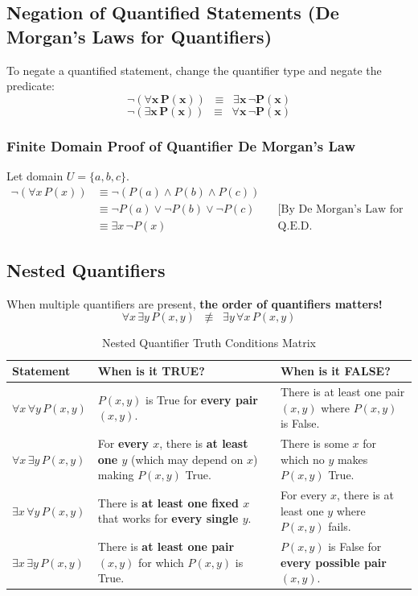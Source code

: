 \documentclass[11pt,a4paper]{article}
\begin{document}
\subsection{Negation of Quantified Statements (De Morgan's Laws for Quantifiers)}

To negate a quantified statement, change the quantifier type and negate the predicate:
$$\mathbf{\neg (\forall x \, P(x)) \;\;\equiv\;\; \exists x \, \neg P(x)}$$
$$\mathbf{\neg (\exists x \, P(x)) \;\;\equiv\;\; \forall x \, \neg P(x)}$$

\subsubsection*{Finite Domain Proof of Quantifier De Morgan's Law}
Let domain $U = \{a, b, c\}$.
\begin{align*}
\neg(\forall x \, P(x)) &\equiv \neg(P(a) \land P(b) \land P(c)) \\
&\equiv \neg P(a) \lor \neg P(b) \lor \neg P(c) && \text{[By De Morgan's Law for Propositional Logic]} \\
&\equiv \exists x \, \neg P(x) && \text{Q.E.D.}
\end{align*}

\subsection{Nested Quantifiers}

When multiple quantifiers are present, \textbf{the order of quantifiers matters!}
$$\forall x \, \exists y \, P(x, y) \;\;\not\equiv\;\; \exists y \, \forall x \, P(x, y)$$

\begin{table}[htbp]
\centering
\small
\begin{tabularx}{\textwidth}{|l|X|X|}
\hline
\rowcolor{secondaryteal} \color{white}\textbf{Statement} & \color{white}\textbf{When is it TRUE?} & \color{white}\textbf{When is it FALSE?} \\ \hline
$\forall x \, \forall y \, P(x, y)$ & $P(x, y)$ is True for \textbf{every pair} $(x, y)$. & There is at least one pair $(x, y)$ where $P(x, y)$ is False. \\ \hline
$\forall x \, \exists y \, P(x, y)$ & For \textbf{every $x$}, there is \textbf{at least one $y$} (which may depend on $x$) making $P(x,y)$ True. & There is some $x$ for which no $y$ makes $P(x,y)$ True. \\ \hline
$\exists x \, \forall y \, P(x, y)$ & There is \textbf{at least one fixed $x$} that works for \textbf{every single $y$}. & For every $x$, there is at least one $y$ where $P(x,y)$ fails. \\ \hline
$\exists x \, \exists y \, P(x, y)$ & There is \textbf{at least one pair} $(x, y)$ for which $P(x, y)$ is True. & $P(x, y)$ is False for \textbf{every possible pair} $(x, y)$. \\ \hline
\end{tabularx}
\caption{Nested Quantifier Truth Conditions Matrix}
\end{table}
\end{document}
